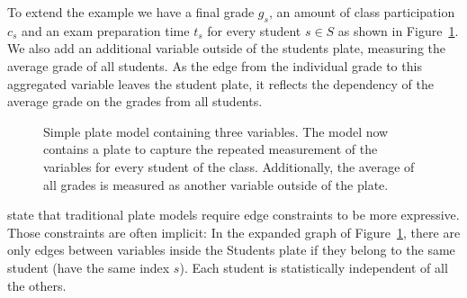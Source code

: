 To extend the example we have a final grade $g_s$, an amount of class participation $c_s$ and an exam preparation time $t_s$ for every student $s \in S$ as shown in Figure~\ref{fig:simple_platemodel}. We also add an additional variable outside of the students plate, measuring the average grade of all students. As the edge from the individual grade to this aggregated variable leaves the student plate, it reflects the dependency of the average grade on the grades from all students.

\begin{figure}[t]
	\begin{center}
    	\scalebox{\tikzScale}{\adjustTikzSize }
	\end{center}
\caption[Simple plate model containing three variables.]{Simple plate model containing three variables. The model now contains a plate to capture the repeated measurement of the variables for every student of the class. Additionally, the average of all grades is measured as another variable outside of the plate.}
		\label{fig:simple_platemodel}
\end{figure}

\textcite{heckerman2007probabilistic} state that traditional plate models require edge constraints to be more expressive. Those constraints are often implicit: In the expanded graph of Figure~\ref{fig:simple_platemodel}, there are only edges between variables inside the Students plate if they belong to the same student (have the same index $s$). Each student is statistically independent of all the others.

